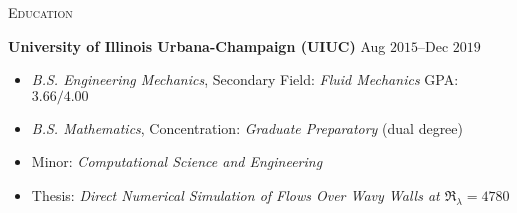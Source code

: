 \documentclass[10pt]{article}
\begin{document}
\begin{multicols}{2}
\textsc{Education}
\columnbreak

\textbf{University of Illinois Urbana-Champaign (UIUC)} \hfill Aug $2015$--Dec $2019$

\vspace{-1.75em}
\begin{itemize}[label= ,leftmargin=1.0em]
    \setlength\itemsep{-0.25em}
    \item \textit{B.S. Engineering Mechanics}, Secondary Field: \textit{Fluid Mechanics} \hfill GPA: $3.66/4.00$
    \item \textit{B.S. Mathematics}, Concentration: \textit{Graduate Preparatory} \hfill (dual degree)
    \item Minor: \textit{Computational Science and Engineering}
    \item Thesis: \textit{Direct Numerical Simulation of Flows Over Wavy Walls at $\Re_\lambda=4780$}
\end{itemize}
\vspace{-2.0em}

\end{multicols}
\vspace{-1.5em}
\end{document}

